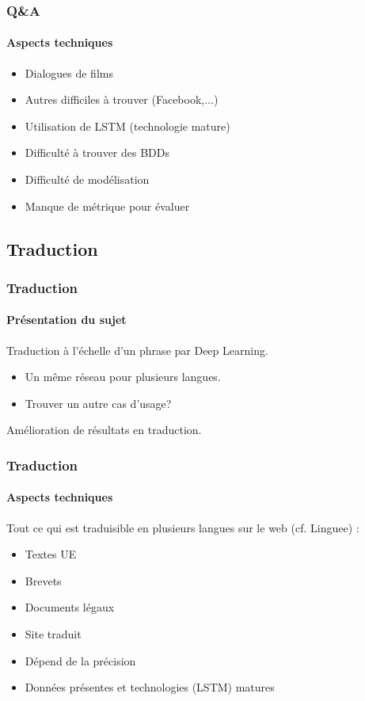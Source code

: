 \begin{frame}
	\frametitle{Q\&A}
	\framesubtitle{Aspects techniques}
		\begin{itemize}
			\item Dialogues de films
			\item Autres difficiles à trouver (Facebook,...)
		\end{itemize}

		\begin{itemize}
			\item Utilisation de LSTM (technologie mature)
			\item Difficulté à trouver des BDDs 
			\item Difficulté de modélisation
			\item Manque de métrique pour évaluer
		\end{itemize}
\end{frame}

\subsection{Traduction}
\begin{frame}
	\frametitle{Traduction}
	\framesubtitle{Présentation du sujet}

		Traduction à l'échelle d'un phrase par Deep Learning.
	
		\begin{itemize}
			\item Un même réseau pour plusieurs langues.
			\item Trouver un autre cas d'usage?
		\end{itemize}
	

		Amélioration de résultats en traduction.
\end{frame}

\begin{frame}
	\frametitle{Traduction}
	\framesubtitle{Aspects techniques}
	
		Tout ce qui est traduisible en plusieurs langues sur le web (cf. Linguee) :
		\begin{multicols}{2}
			\begin{itemize}
				\item Textes UE
				\item Brevets
				\item Documents légaux
				\item Site traduit
			\end{itemize}
		\end{multicols}

	\vspace*{-.2cm}

		\begin{itemize}
			\item Dépend de la précision
			\item Données présentes et technologies (LSTM) matures
		\end{itemize}
\end{frame}


